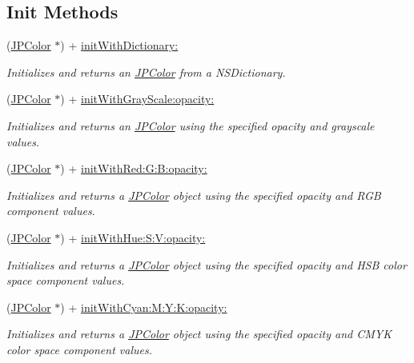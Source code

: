 \subsection*{Init Methods}
\begin{DoxyCompactItemize}
\item 
(\hyperlink{interface_j_p_color}{JPColor} $\ast$) + \hyperlink{interface_j_p_color_a5f07346b927b9b7355dc51b1330641f3}{initWithDictionary:}
\begin{DoxyCompactList}\small\item\em Initializes and returns an \hyperlink{interface_j_p_color}{JPColor} from a NSDictionary. \item\end{DoxyCompactList}\item 
(\hyperlink{interface_j_p_color}{JPColor} $\ast$) + \hyperlink{interface_j_p_color_a0e5015082d770f62b9778da3d00e1503}{initWithGrayScale:opacity:}
\begin{DoxyCompactList}\small\item\em Initializes and returns an \hyperlink{interface_j_p_color}{JPColor} using the specified opacity and grayscale values. \item\end{DoxyCompactList}\item 
(\hyperlink{interface_j_p_color}{JPColor} $\ast$) + \hyperlink{interface_j_p_color_a825ecad2dbb5a12d86e07263ecde4e27}{initWithRed:G:B:opacity:}
\begin{DoxyCompactList}\small\item\em Initializes and returns a \hyperlink{interface_j_p_color}{JPColor} object using the specified opacity and RGB component values. \item\end{DoxyCompactList}\item 
(\hyperlink{interface_j_p_color}{JPColor} $\ast$) + \hyperlink{interface_j_p_color_a608d8aae9deb9db4549eaaa0cdb05604}{initWithHue:S:V:opacity:}
\begin{DoxyCompactList}\small\item\em Initializes and returns a \hyperlink{interface_j_p_color}{JPColor} object using the specified opacity and HSB color space component values. \item\end{DoxyCompactList}\item 
(\hyperlink{interface_j_p_color}{JPColor} $\ast$) + \hyperlink{interface_j_p_color_ade815fda8c301fe43cda27b0f5312c9b}{initWithCyan:M:Y:K:opacity:}
\begin{DoxyCompactList}\small\item\em Initializes and returns a \hyperlink{interface_j_p_color}{JPColor} object using the specified opacity and CMYK color space component values. \item\end{DoxyCompactList}\item 

\end{DoxyCompactItemize}
